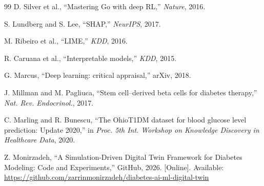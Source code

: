 \documentclass[journal]{IEEEtran}
\begin{document}
\begin{thebibliography}{99}
D. Silver et al., “Mastering Go with deep RL,” \textit{Nature}, 2016.

S. Lundberg and S. Lee, “SHAP,” \textit{NeurIPS}, 2017.

M. Ribeiro et al., “LIME,” \textit{KDD}, 2016.

R. Caruana et al., “Interpretable models,” \textit{KDD}, 2015.

G. Marcus, “Deep learning: critical appraisal,” arXiv, 2018.

J. Millman and M. Pagliuca, “Stem cell–derived beta cells for diabetes therapy,” \textit{Nat. Rev. Endocrinol.}, 2017.

C. Marling and R. Bunescu, “The OhioT1DM dataset for blood glucose level prediction: Update 2020,” in \textit{Proc. 5th Int. Workshop on Knowledge Discovery in Healthcare Data}, 2020.

Z. Monirzadeh, “A Simulation-Driven Digital Twin Framework for Diabetes Modeling: Code and Experiments,”
GitHub, 2026. [Online]. Available:
\url{https://github.com/zarrinmonirzadeh/diabetes-ai-ml-digital-twin}

\end{thebibliography}
\end{document}
